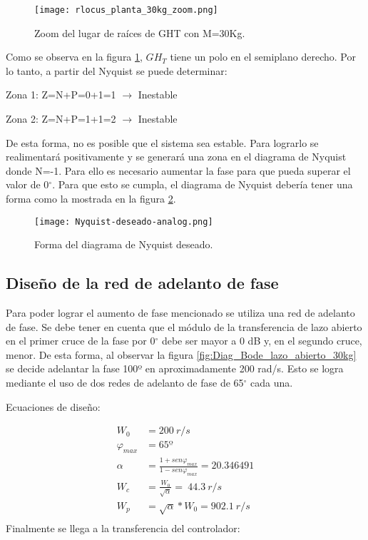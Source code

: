 \begin{figure}[H]
	\centering
	\texttt{[image: rlocus\_planta\_30kg\_zoom.png]}
	\caption{Zoom del lugar de raíces de GHT con M=30Kg.}
	\label{fig:rlocus_m30kg_zoom}
\end{figure}

\noindent Como se observa en la figura \ref{fig:rlocus_m30kg_zoom}, $GH_{T}$ tiene un polo en el semiplano derecho. Por lo tanto, a partir del Nyquist se puede determinar:

\noindent Zona 1: Z=N+P=0+1=1 $\mathrm{\to}$ Inestable 

\noindent Zona 2: Z=N+P=1+1=2 $\mathrm{\to}$ Inestable

\noindent De esta forma, no es posible que el sistema sea estable. Para lograrlo se realimentar\'{a} positivamente y se generar\'{a} una zona en el diagrama de Nyquist donde N=-1. Para ello es necesario aumentar la fase para que pueda superar el valor de 0$\mathrm{{}^\circ}$.  Para que esto se cumpla, el diagrama de Nyquist deber\'{i}a tener una forma como la  mostrada en la figura \ref{fig:nyquist-deseado-analog}.

\begin{figure}[H]
	\centering
	\texttt{[image: Nyquist-deseado-analog.png]}
	\caption{Forma del diagrama de Nyquist deseado.}
	\label{fig:nyquist-deseado-analog}
\end{figure}

\subsection{Diseño de la red de adelanto de fase}

\noindent Para poder lograr el aumento de fase mencionado se utiliza una red de adelanto de fase. Se debe tener en cuenta que el m\'{o}dulo de la transferencia de lazo abierto en el primer cruce de la fase por 0$\mathrm{{}^\circ}$ debe ser mayor a 0 dB y, en el segundo cruce, menor. De esta forma, al observar la figura \ref{fig:Diag_Bode_lazo_abierto_30kg} se decide adelantar la fase 100º en aproximadamente 200 rad/s. Esto se logra mediante el uso de dos redes de adelanto de fase de 65$\mathrm{{}^\circ}$ cada una.

\noindent Ecuaciones de dise\~{n}o:

\begin{equation*}
	\begin{aligned}
		W_0 &=200\ r/s\\
		{\varphi }_{max} &=65\textrm{º}\\
		\alpha &=\frac{1+sen{\varphi }_{max}}{1-sen{\varphi }_{max}}=20.346491\\
		W_c &=\frac{W_0}{\sqrt{\alpha }}=\ 44.3\ r/s\\
		W_p &=\sqrt{\alpha }*W_0=902.1\ r/s\\
	\end{aligned}
\end{equation*} 
\noindent Finalmente se llega a la transferencia del controlador:

